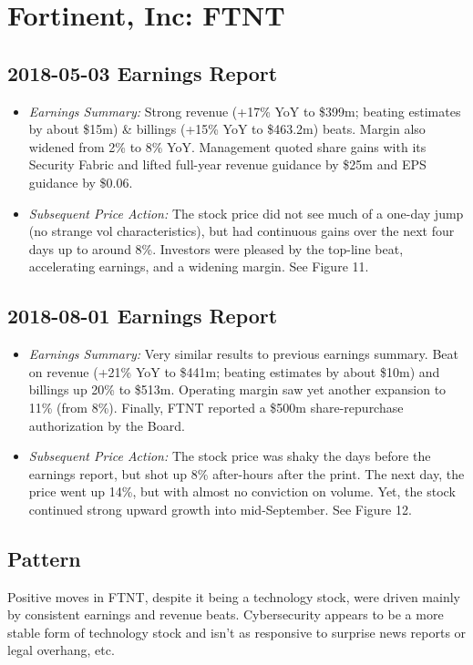 \documentclass[11pt]{article}
\begin{document}
\section{Fortinent, Inc: FTNT}
    \subsection{2018-05-03 Earnings Report}
        \begin{itemize}
            \item \textit{Earnings Summary:} Strong revenue (+17\% YoY to \$399m; beating estimates by about \$15m) \& billings (+15\% YoY to \$463.2m) beats. Margin also widened from 2\% to 8\% YoY. Management quoted share gains with its Security Fabric and lifted full-year revenue guidance by \$25m and EPS guidance by \$0.06.
            \item \textit{Subsequent Price Action:} The stock price did not see much of a one-day jump (no strange vol characteristics), but had continuous gains over the next four days up to around 8\%. Investors were pleased by the top-line beat, accelerating earnings, and a widening margin. See Figure 11.
        \end{itemize}
    \subsection{2018-08-01 Earnings Report}
        \begin{itemize}
            \item \textit{Earnings Summary:} Very similar results to previous earnings summary. Beat on revenue (+21\% YoY to \$441m; beating estimates by about \$10m) and billings up 20\% to \$513m. Operating margin saw yet another expansion to 11\% (from 8\%). Finally, FTNT reported a \$500m share-repurchase authorization by the Board.
            \item \textit{Subsequent Price Action:} The stock price was shaky the days before the earnings report, but shot up 8\% after-hours after the print. The next day, the price went up 14\%, but with almost no conviction on volume. Yet, the stock continued strong upward growth into mid-September. See Figure 12.
        \end{itemize}
    \subsection{Pattern}
        Positive moves in FTNT, despite it being a technology stock, were driven mainly by consistent earnings and revenue beats. Cybersecurity appears to be a more stable form of technology stock and isn't as responsive to surprise news reports or legal overhang, etc.
\end{document}
